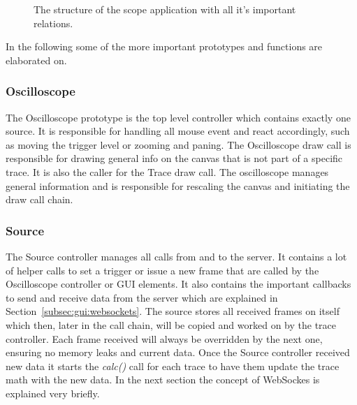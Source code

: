\begin{figure}
    \centering
    
    \caption[The scope structure]{%
        The structure of the scope application with all it's important relations.%
    }
    \label{fig:gui:structure}
\end{figure}

In the following some of the more important prototypes and functions are elaborated on.

%
%

\subsubsection*{Oscilloscope}

The Oscilloscope prototype is the top level controller which contains exactly one source. It is responsible for handling all mouse event and react accordingly, such as moving the trigger level or zooming and paning.
The Oscilloscope draw call is responsible for drawing general info on the canvas that is not part of a specific trace.
It is also the caller for the Trace draw call. The oscilloscope manages general information and is responsible for rescaling the canvas and initiating the draw call chain.

\subsubsection*{Source}

The Source controller manages all calls from and to the server. It contains a lot of helper calls to set a trigger or issue a new frame that are called by the Oscilloscope controller or GUI elements.
It also contains the important callbacks to send and receive data from the server which are explained in Section~\ref{subsec:gui:websockets}.
The source stores all received frames on itself which then, later in the call chain, will be copied and worked on by the trace controller.
Each frame received will always be overridden by the next one, ensuring no memory leaks and current data.
Once the Source controller received new data it starts the \textit{calc()} call for each trace to have them update the trace math with the new data.
In the next section the concept of WebSockes is explained very briefly. 

%
%

